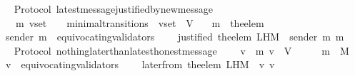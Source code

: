 \begin{isabellebody}
%
\isadelimproof
\ \ %
\endisadelimproof
%
\isatagproof
{}\isamarkupfalse%
%
\endisatagproof
{\isafoldproof}%
%
\isadelimproof
\isanewline
%
\endisadelimproof
\isanewline
\isanewline
{}\isamarkupfalse%
\ {\isacharparenleft}\ Protocol{\isacharparenright}\ latest{\isacharunderscore}message{\isacharunderscore}justified{\isacharunderscore}by{\isacharunderscore}new{\isacharunderscore}message\ {\isacharcolon}\isanewline
\ \ {\isachardoublequoteopen}{\isasymforall}\ {\isasymsigma}\ {\isasymsigma}{\isacharprime}\ m{\isacharprime}\ v{\isacharunderscore}set{\isachardot}\ {\isacharparenleft}{\isasymsigma}{\isacharcomma}\ {\isasymsigma}{\isacharprime}{\isacharparenright}\ {\isasymin}\ minimal{\isacharunderscore}transitions\ {\isasymand}\ v{\isacharunderscore}set\ {\isasymsubseteq}\ V\isanewline
\ \ {\isasymlongrightarrow}\ m{\isacharprime}\ {\isacharequal}\ the{\isacharunderscore}elem\ {\isacharparenleft}{\isasymsigma}{\isacharprime}\ {\isacharminus}\ {\isasymsigma}{\isacharparenright}\isanewline
\ \ {\isasymlongrightarrow}\ sender\ m{\isacharprime}\ {\isasymnotin}\ equivocating{\isacharunderscore}validators\ {\isasymsigma}{\isacharprime}\isanewline
\ \ {\isasymlongrightarrow}\ justified\ {\isacharparenleft}the{\isacharunderscore}elem\ {\isacharparenleft}L{\isacharunderscore}H{\isacharunderscore}M\ {\isasymsigma}\ {\isacharparenleft}sender\ m{\isacharprime}{\isacharparenright}{\isacharparenright}{\isacharparenright}\ m{\isacharprime}{\isachardoublequoteclose}\isanewline
%
\isadelimproof
\ \ %
\endisadelimproof
%
\isatagproof
{}\isamarkupfalse%
%
\endisatagproof
{\isafoldproof}%
%
\isadelimproof
\isanewline
%
\endisadelimproof
\isanewline
\isanewline
{}\isamarkupfalse%
\ {\isacharparenleft}\ Protocol{\isacharparenright}\ nothing{\isacharunderscore}later{\isacharunderscore}than{\isacharunderscore}latest{\isacharunderscore}honest{\isacharunderscore}message\ {\isacharcolon}\isanewline
\ \ {\isachardoublequoteopen}{\isasymforall}\ v\ {\isasymsigma}\ m{\isachardot}\ v\ {\isasymin}\ V\ {\isasymand}\ {\isasymsigma}\ {\isasymin}\ {\isasymSigma}\ {\isasymand}\ m\ {\isasymin}\ M\isanewline
\ \ {\isasymlongrightarrow}\ v\ {\isasymnotin}\ equivocating{\isacharunderscore}validators\ {\isasymsigma}{\isacharprime}\isanewline
\ \ {\isasymlongrightarrow}\ later{\isacharunderscore}from\ {\isacharparenleft}the{\isacharunderscore}elem\ {\isacharparenleft}L{\isacharunderscore}H{\isacharunderscore}M\ {\isasymsigma}\ v{\isacharparenright}{\isacharcomma}\ v{\isacharcomma}\ {\isasymsigma}{\isacharparenright}\ {\isacharequal}\ \ {\isasymemptyset}{\isachardoublequoteclose}\isanewline

\end{isabellebody}
